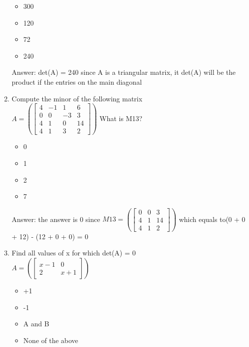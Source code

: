 \documentclass{article}
\begin{document}
\begin{enumerate}
        \begin{itemize}
            \item 300
            \item 120
            \item 72
            \item 240
        \end{itemize}    
        
        Answer: det(A) = 240 since A is a triangular matrix, it det(A) will be the product if the entries on the main diagonal
    
    
    \item Compute the minor of the following matrix\\
        $A = \left( \begin{bmatrix} 4& -1& 1& 6\\ 0& 0& -3& 3\\ 4& 1& 0& 14\\ 4& 1& 3& 2\end{bmatrix} \right)$
        What is M13?
        
        \begin{itemize}
            \item 0
            \item 1
            \item 2
            \item 7
        \end{itemize}    
        
        Answer: the answer is 0 since 
        $M13 = \left( \begin{bmatrix} 0& 0& 3\\ 4& 1& 14\\ 4& 1& 2\end{bmatrix} \right)$
        which equals to(0 + 0 + 12) - (12 + 0 + 0) = 0
    
    \item Find all values of x for which det(A) = 0 \\
        $A = \left( \begin{bmatrix} x-1 & 0 \\ 2& x+1 \end{bmatrix} \right)$

        \begin{itemize}
            \item +1
            \item -1
            \item A and B
            \item None of the above
        \end{itemize} 
        

\end{enumerate}
\end{document}
